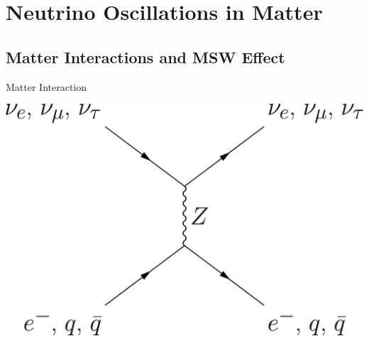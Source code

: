 \section{Neutrino Oscillations in Matter}


\subsection{Matter Interactions and MSW Effect}


\begin{frame}{Matter Interaction}





\begin{tcolorbox}[sidebyside]
\centering
\centering
\includegraphics[height=0.32\textheight]{assets/neutral-current.png}


\end{tcolorbox}
\end{frame}
